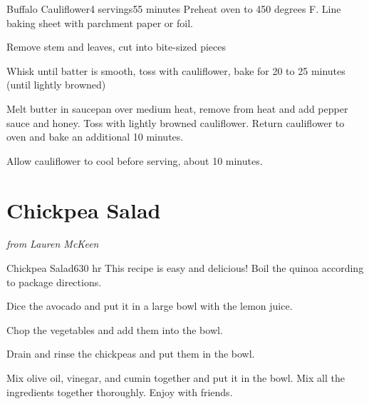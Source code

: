 \documentclass[openany]{book}
\begin{document}
\begin{recipe}{Buffalo Cauliflower}{4 servings}{55 minutes}
\freeform Preheat oven to 450 degrees F.  Line baking sheet with parchment paper or foil.

Remove stem and leaves, cut into bite-sized pieces


Whisk until batter is smooth, toss with cauliflower, bake for 20 to 25 minutes (until lightly browned)


Melt butter in saucepan over medium heat, remove from heat and add pepper sauce and honey. Toss with lightly browned cauliflower. Return cauliflower to oven and bake an additional 10 minutes.

\freeform Allow cauliflower to cool before serving, about 10 minutes.

\end{recipe}

\chapter{Chickpea Salad}\label{chickpea-salad}

\emph{from Lauren McKeen}

\begin{recipe}{Chickpea Salad}{6}{30 hr}
\freeform This recipe is easy and delicious!
Boil the quinoa according to package directions.

Dice the avocado and put it in a large bowl with the lemon juice.

Chop the vegetables and add them into the bowl.

Drain and rinse the chickpeas and put them in the bowl.

Mix olive oil, vinegar, and cumin together and put it in the bowl. Mix all the ingredients together thoroughly. Enjoy with friends.
\end{recipe}
\end{document}
